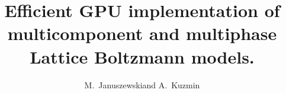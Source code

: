 \documentclass[mathpazo,sort,numbers]{cicp}
\begin{document}
\title{Efficient GPU implementation of multicomponent and multiphase Lattice Boltzmann models.}

\author[M.~Januszewski and A.~Kuzmin]{M.~Januszewski\corrauth and A.~Kuzmin}
\address{\ Institute of Physics, University of Silesia, 40-007 Katowice, Poland\\
\ Department of Mechanical and Manufacturing Engineering,
Schulich School of Engineering,
University of Calgary, 2500 University Drive NW ,Calgary, Alberta, T2N 1N4 Canada
}

\end{document}
